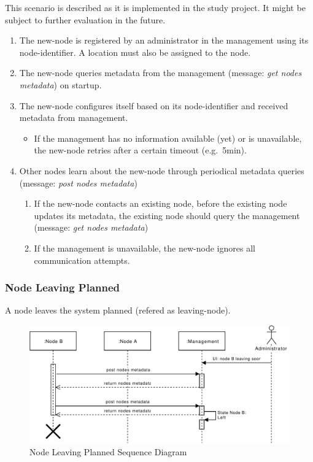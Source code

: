 This scenario is described as it is implemented in the study project. It might be subject to further evaluation in the future.

\begin{enumerate}
    \item The \gls{new-node} is registered by an \gls{administrator} in the \gls{management} using its \gls{node-identifier}. A \gls{location} must also be assigned to the \gls{node}. %
    \item The \gls{new-node} queries \gls{metadata} from the \gls{management} (message: \emph{get nodes metadata}) on startup.
    \item The \gls{new-node} configures itself based on its \gls{node-identifier} and received \gls{metadata} from \gls{management}.
        \begin{itemize}
            \item If the \gls{management} has no information available (yet) or is unavailable, the \gls{new-node} retries after a certain timeout (e.g.\ 5min).
        \end{itemize}
    \item Other \glspl{node} learn about the \gls{new-node} through periodical \gls{metadata} queries (message: \emph{post nodes metadata})
        \begin{enumerate}
            \item If the \gls{new-node} contacts an existing \gls{node}, before the existing \gls{node} updates its \gls{metadata}, the existing \gls{node} should query the \gls{management} (message: \emph{get nodes metadata})
            \item If the \gls{management} is unavailable, the \gls{new-node} ignores all communication attempts.
        \end{enumerate}
\end{enumerate}

\subsubsection{Node Leaving Planned}\label{sec:scenario-node-leave-planned}
A \gls{node} leaves the system planned (refered as \gls{leaving-node}).

\begin{figure}[h]
    \centering
    \includegraphics[width=\linewidth]{resources/node_leaving_planned.pdf}
    \caption{Node Leaving Planned Sequence Diagram}
    \label{fig:node-leave-planned}
\end{figure}

